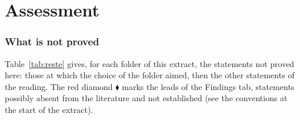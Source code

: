 \documentclass[11pt]{article}
\theoremstyle{plain}
\theoremstyle{definition}
\theoremstyle{remark}
\begin{document}
\part*{Assessment}

\section{What is not proved}\label{sec:reste}

Table~\ref{tab:reste} gives, for each folder of this extract, the statements not proved here: those at which the choice of the folder aimed, then the other statements of the reading. The red diamond \textcolor{piste}{\ensuremath{\blacklozenge}} marks the leads of the Findings tab, statements possibly absent from the literature and not established (see the conventions at the start of the extract).
\end{document}
